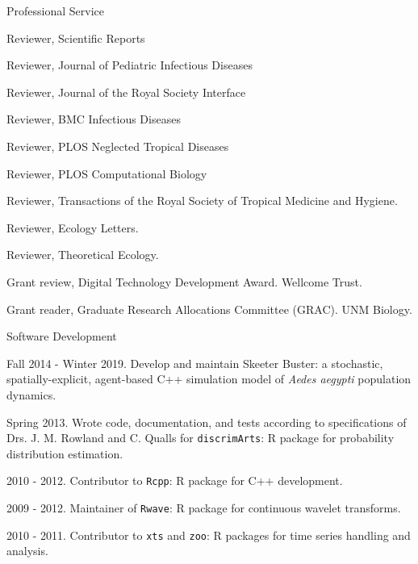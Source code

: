 \documentclass{resume} %
\begin{document}
\begin{rSection}{Professional Service}
\item Reviewer, Scientific Reports
\item Reviewer, Journal of Pediatric Infectious Diseases
\item Reviewer, Journal of the Royal Society Interface
\item Reviewer, BMC Infectious Diseases
\item Reviewer, PLOS Neglected Tropical Diseases
\item Reviewer, PLOS Computational Biology
\item Reviewer, Transactions of the Royal Society of Tropical Medicine and Hygiene.
\item Reviewer, Ecology Letters.
\item Reviewer, Theoretical Ecology.
\item Grant review, Digital Technology Development Award. Wellcome Trust.
\item Grant reader, Graduate Research Allocations Committee (GRAC). UNM Biology.
\end{rSection}

\begin{rSection}{Software Development}
\item Fall 2014 - Winter 2019. Develop and maintain Skeeter Buster: a stochastic,
spatially-explicit, agent-based C++ simulation model of {\em Aedes aegypti}
population dynamics.
\item Spring 2013. Wrote code, documentation, and tests according to
specifications of Drs. J. M. Rowland and C. Qualls for \texttt{discrimArts}: R package for probability
distribution estimation.
\item 2010 - 2012. Contributor to \texttt{Rcpp}: R package for C++ development.
\item 2009 - 2012. Maintainer of \texttt{Rwave}: R package for continuous wavelet transforms.
\item 2010 - 2011. Contributor to \texttt{xts} and \texttt{zoo}: R packages for time series handling and analysis.
\end{rSection}
\end{document}
